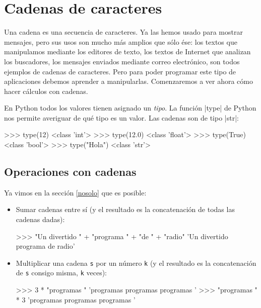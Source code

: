 \chapter{Cadenas de caracteres}

Una cadena es una secuencia de caracteres. Ya las hemos usado para mostrar
mensajes, pero sus usos son mucho más amplios que sólo ése: los textos que
manipulamos mediante los editores de texto, los textos de Internet que
analizan los buscadores, los mensajes enviados mediante correo electrónico,
son todos ejemplos de cadenas de caracteres. Pero para poder programar este
tipo de aplicaciones debemos aprender a manipularlas. Comenzaremos a ver
ahora cómo hacer cálculos con cadenas.

\begin{sabias_que}
En Python todos los valores tienen asignado un {\it tipo}. 	La función |type|
de Python nos permite averiguar de qué tipo es un valor. Las cadenas son de
tipo |str|:

\begin{codigo-python-sn}
>>> type(12)
<class 'int'>
>>> type(12.0)
<class 'float'>
>>> type(True)
<class 'bool'>
>>> type("Hola")
<class 'str'>
\end{codigo-python-sn}
\end{sabias_que}

\section{Operaciones con cadenas}

Ya vimos en la sección \ref{nosolo} que es posible:

\begin{itemize}
\item Sumar cadenas entre sí (y el resultado es la concatenación
de todas las cadenas dadas):

\begin{codigo-python-sn}
>>> "Un divertido " + "programa " + "de " + "radio"
'Un divertido programa de radio'
\end{codigo-python-sn}

\item Multiplicar una cadena \lstinline+s+ por un número \lstinline+k+ (y
el resultado es la concatenación de \lstinline+s+ consigo misma,
\lstinline+k+ veces):

\begin{codigo-python-sn}
>>> 3 * "programas "
'programas programas programas '
>>> "programas " * 3
'programas programas programas '
\end{codigo-python-sn}
\end{itemize}


